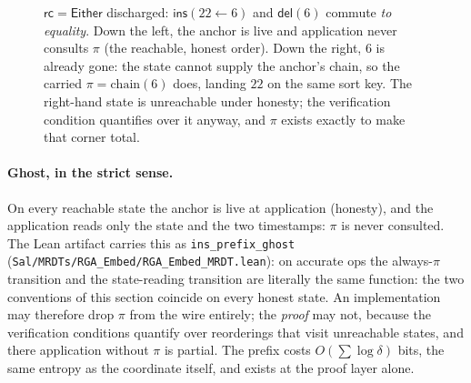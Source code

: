 \documentclass[11pt]{article}
\newcommand{\del}{\mathsf{del}}
\newcommand{\ins}{\mathsf{ins}}
\newcommand{\rc}{\mathsf{rc}}
\newcommand{\Either}{\textsf{Either}}
\newcommand{\code}[1]{\texttt{#1}}
\newcommand{\chain}{\mathrm{chain}}
\begin{document}
\begin{figure}[h]
\centering
{}
\caption{$\rc = \Either$ discharged: $\ins(22 \leftarrow 6)$ and
$\del(6)$ commute \emph{to equality}. Down the left, the anchor is
live and application never consults $\pi$ (the reachable, honest
order). Down the right, $6$ is already gone: the state cannot
supply the anchor's chain, so the carried $\pi = \chain(6)$ does,
landing $22$ on the same sort key. The right-hand state is
unreachable under honesty; the verification condition quantifies
over it anyway, and $\pi$ exists exactly to make that corner total.}
\label{fig:commute}
\end{figure}

\paragraph{Ghost, in the strict sense.} On every reachable state the
anchor is live at application (honesty), and the application reads
only the state and the two timestamps: $\pi$ is never consulted. The
Lean artifact carries this as \code{ins\_prefix\_ghost}
(\code{Sal/MRDTs/RGA\_Embed/RGA\_Embed\_MRDT.lean}): on accurate
ops the always-$\pi$ transition and the state-reading transition are
literally the same function: the two conventions of this section
coincide on every honest state. An implementation may therefore drop
$\pi$ from the wire
entirely; the \emph{proof} may not, because the verification
conditions quantify over reorderings that visit unreachable states,
and there application without $\pi$ is partial. The prefix costs
$O(\sum \log \delta)$ bits, the same entropy as the coordinate
itself, and exists at the proof layer alone.
\end{document}
